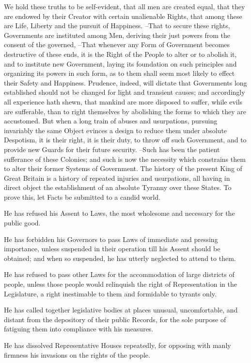 \documentclass[a4paper,landscape,10pt]{article}
\begin{document}
We hold these truths to be self-evident,
that all men are created equal,
that they are endowed by their Creator with certain unalienable Rights,
that among these are Life, Liberty and the pursuit of Happiness.
--That to secure these rights, Governments are instituted among Men,
deriving their just powers from the consent of the governed,
--That whenever any Form of Government becomes destructive of these ends,
it is the Right of the People to alter or to abolish it,
and to institute new Government,
laying its foundation on such principles and organizing its powers in such form,
as to them shall seem most likely to effect their Safety and Happiness.
Prudence, indeed, will dictate that Governments long established should not be changed for light and transient causes;
and accordingly all experience hath shewn,
that mankind are more disposed to suffer,
while evils are sufferable,
than to right themselves by abolishing the forms to which they are accustomed.
But when a long train of abuses and usurpations,
pursuing invariably the same Object
evinces a design to reduce them under absolute Despotism,
it is their right,
it is their duty,
to throw off such Government,
and to provide new Guards for their future security.
--Such has been the patient sufferance of these Colonies;
and such is now the necessity which constrains them to alter their former Systems of Government.
The history of the present King of Great Britain is a history of repeated injuries and usurpations,
all having in direct object the establishment of an absolute Tyranny over these States.
To prove this, let Facts be submitted to a candid world.

He has refused his Assent to Laws,
the most wholesome and necessary for the public good.

He has forbidden his Governors to pass Laws of immediate and pressing importance,
unless suspended in their operation till his Assent should be obtained;
and when so suspended, he has utterly neglected to attend to them.

He has refused to pass other Laws for the accommodation of large districts of people,
unless those people would relinquish the right of Representation in the Legislature,
a right inestimable to them and formidable to tyrants only.

He has called together legislative bodies at places unusual, uncomfortable, and distant from the depository of their public Records,
for the sole purpose of fatiguing them into compliance with his measures.

He has dissolved Representative Houses repeatedly,
for opposing with manly firmness his invasions on the rights of the people.
\end{document}
